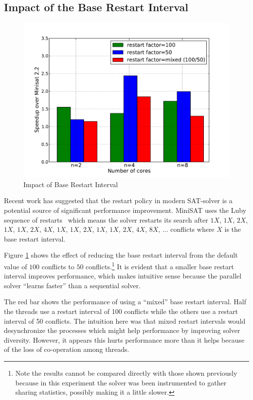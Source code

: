 \documentclass[letterpaper, compsoc, conference]{IEEEtran}
\begin{document}
\subsection{Impact of the Base Restart Interval}

\begin{figure}[htbp]
  \includegraphics[width=\columnwidth]{images/restart_speedup1.pdf}
  \caption{Impact of Base Restart Interval}
  \label{fig:restart}
\end{figure}

Recent work \cite{HuangRestart2007} has suggested that the restart policy in
modern SAT-solver is a potential source of significant performance improvement.
MiniSAT uses the Luby sequence of restarts~\cite{Luby93optimalspeedup}
which means the solver restarts its search after $1X$, $1X$, $2X$, $1X$, $1X$,
$2X$, $4X$, $1X$, $1X$, $2X$, $1X$, $1X$, $2X$, $4X$, $8X$, $\dots$ conflicts
where $X$ is the base restart interval. 

Figure \ref{fig:restart} shows the effect of reducing the base restart interval
from the default value of $100$ conflicts to $50$ conflicts.\footnote{Note the
results cannot be compared directly with those shown previously because in this
experiment the solver was been instrumented to gather sharing statistics,
possibly making it a little slower.} It is evident that a smaller base restart
interval improves performance, which makes intuitive sense because the parallel
solver ``learns faster'' than a sequential solver. 

The red bar shows the performance of using a ``mixed'' base restart interval.
Half the threads use a restart interval of 100 conflicts while the others use a
restart interval of 50 conflicts. The intuition here was that mixed restart
intervals would desynchronize the processes which might help performance by
improving solver diversity. However, it appears this hurts performance more
than it helps because of the loss of co-operation among threads.
\end{document}
